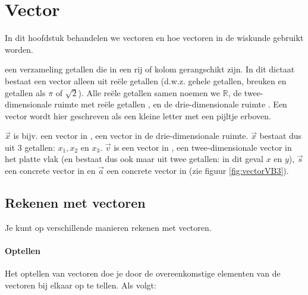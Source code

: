 \chapter{Vector}
\label{chap:vectoren}
In dit hoofdstuk behandelen we vectoren en hoe vectoren in de wiskunde gebruikt worden.

 {een verzameling getallen die in een rij of kolom gerangschikt zijn.} In dit dictaat bestaat een vector alleen uit reële getallen (d.w.z. gehele getallen, breuken en getallen als $\pi$ of $\sqrt{2}$). Alle reële getallen samen noemen we $\mathbb{R}$, de twee-dimensionale ruimte met reële getallen \RT, en de drie-dimensionale ruimte \RD.
Een vector wordt hier geschreven als een kleine letter met een pijltje erboven. 


$\vec{x}$ is bijv. een vector in \RD, een vector in de drie-dimensionale ruimte. $\vec{x} $  bestaat dus uit 3 getallen: $x_{1}, x_{2}$ en $x_{3}$. $\vec{v}$ is een vector in \RT, een twee-dimensionale vector in het platte vlak (en bestaat dus ook maar uit twee getallen: in dit geval $x$ en $y$), $\vec{s}$ een concrete vector in \RD en $\vec{a}  $ een concrete vector in \RT (zie figuur  \ref{fig:vectorVB3}).


\section{Rekenen met vectoren}
Je kunt op verschillende manieren rekenen met vectoren.

\subsubsection{Optellen}
Het optellen van vectoren doe je door de overeenkomstige elementen van de vectoren bij elkaar op te tellen. Als volgt:


